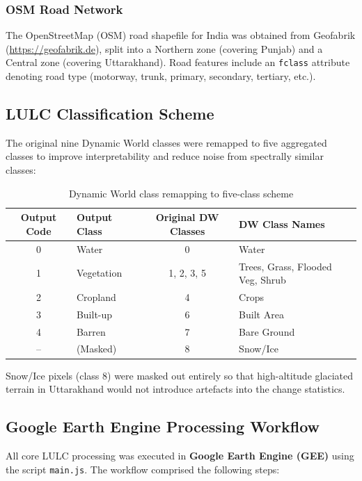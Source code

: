\documentclass[12pt,a4paper]{article}
\begin{document}
\subsubsection{OSM Road Network}
The OpenStreetMap (OSM) road shapefile for India was obtained from Geofabrik (\url{https://geofabrik.de}), split into a Northern zone (covering Punjab) and a Central zone (covering Uttarakhand). Road features include an \texttt{fclass} attribute denoting road type (motorway, trunk, primary, secondary, tertiary, etc.).

\subsection{LULC Classification Scheme}

The original nine Dynamic World classes were remapped to five aggregated classes to improve interpretability and reduce noise from spectrally similar classes:

\begin{table}[H]
\centering
\caption{Dynamic World class remapping to five-class scheme}
\label{tab:remap}
\begin{tabular}{clcl}
\toprule
\textbf{Output Code} & \textbf{Output Class} & \textbf{Original DW Classes} & \textbf{DW Class Names} \\
\midrule
0 & Water       & 0        & Water \\
1 & Vegetation  & 1, 2, 3, 5 & Trees, Grass, Flooded Veg, Shrub \\
2 & Cropland    & 4        & Crops \\
3 & Built-up    & 6        & Built Area \\
4 & Barren      & 7        & Bare Ground \\
-- & (Masked)   & 8        & Snow/Ice \\
\bottomrule
\end{tabular}
\end{table}

Snow/Ice pixels (class 8) were masked out entirely so that high-altitude glaciated terrain in Uttarakhand would not introduce artefacts into the change statistics.

\subsection{Google Earth Engine Processing Workflow}

All core LULC processing was executed in \textbf{Google Earth Engine (GEE)} using the script \texttt{main.js}. The workflow comprised the following steps:
\end{document}
